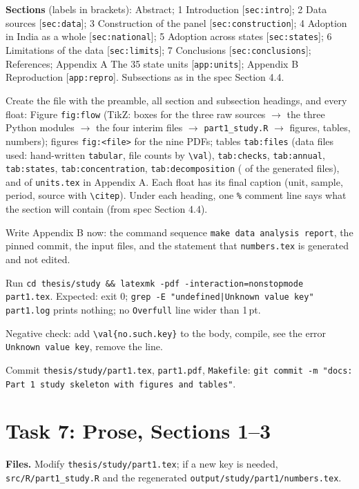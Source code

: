 \documentclass[10pt,a4paper]{article}
\newcommand{\f}[1]{\texttt{#1}}
\begin{document}
\textbf{Sections} (labels in brackets): Abstract; 1 Introduction [\f{sec:intro}]; 2 Data sources [\f{sec:data}];
3 Construction of the panel [\f{sec:construction}]; 4 Adoption in India as a whole [\f{sec:national}];
5 Adoption across states [\f{sec:states}]; 6 Limitations of the data [\f{sec:limits}]; 7 Conclusions
[\f{sec:conclusions}]; References; Appendix A The 35 state units [\f{app:units}]; Appendix B Reproduction
[\f{app:repro}]. Subsections as in the spec Section 4.4.

\begin{steps}
\item Create the file with the preamble, all section and subsection headings, and every float: Figure
      \f{fig:flow} (TikZ: boxes for the three raw sources $\to$ the three Python modules $\to$ the four interim
      files $\to$ \f{part1\_study.R} $\to$ figures, tables, numbers); figures \f{fig:<file>} for the nine PDFs;
      tables \f{tab:files} (data files used: hand-written \f{tabular}, file counts by \verb|\val|),
      \f{tab:checks}, \f{tab:annual}, \f{tab:states}, \f{tab:concentration}, \f{tab:decomposition}
      (\verb|| of the generated files), and \verb|| of \f{units.tex} in Appendix A. Each float has its
      final caption (unit, sample, period, source with \verb|\citep|). Under each heading, one \verb|%| comment
      line says what the section will contain (from spec Section 4.4).
\item Write Appendix B now: the command sequence \f{make data analysis report}, the pinned commit, the input
      files, and the statement that \f{numbers.tex} is generated and not edited.
\item Run \f{cd thesis/study \&\& latexmk -pdf -interaction=nonstopmode part1.tex}. Expected: exit 0;
      \f{grep -E "undefined|Unknown value key" part1.log} prints nothing; no \f{Overfull} line wider than 1\,pt.
\item Negative check: add \verb|\val{no.such.key}| to the body, compile, see the error \f{Unknown value key},
      remove the line.
\item Commit \f{thesis/study/part1.tex}, \f{part1.pdf}, \f{Makefile}:
      \f{git commit -m "docs: Part 1 study skeleton with figures and tables"}.
\end{steps}

\section{Task 7: Prose, Sections 1--3}
\textbf{Files.} Modify \f{thesis/study/part1.tex}; if a new key is needed, \f{src/R/part1\_study.R} and the
regenerated \f{output/study/part1/numbers.tex}.
\end{document}
